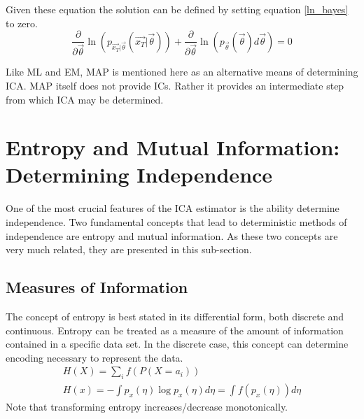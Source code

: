 \documentclass[12pt ]{article}
\begin{document}
Given these equation the solution can be defined by setting equation \ref{ln_bayes} to zero.
\begin{equation}
 \frac{\partial} {\partial \vec{\theta} } \ln( p_{\vec{x_T} | \vec{\theta}}(\vec{x_T} | \vec{\theta})) + \frac{\partial} {\partial \vec{\theta} } \ln (p_{\vec{\theta}} (\vec{\theta}) d\vec{\theta} ) = 0 
\end{equation}

Like ML and EM, MAP is mentioned here as an alternative means of determining ICA.   MAP itself does not provide ICs.  Rather it provides an intermediate step from which ICA may be determined.   

\section{Entropy and Mutual Information: Determining Independence}\label{entropy}
One of the most crucial features of the ICA estimator is the ability determine independence.  Two fundamental concepts that lead to deterministic methods of independence are entropy and mutual information.  As these two concepts are very much related, they are presented in this sub-section.

\subsection{Measures of Information}
The concept of entropy is best stated in its differential form, both discrete and continuous.  Entropy can be treated as a measure of the amount of information contained in a specific data set.  In the discrete case, this concept can determine encoding necessary to represent the data.
\begin{eqnarray}
H(X) = \sum_i f(P(X =a_i)) \\
H(x) = - \int p_x (\eta) \log p_x (\eta) d\eta = \int f(p_x(\eta))d\eta
\end{eqnarray}
Note that transforming entropy increases/decrease monotonically.  %
\end{document}
